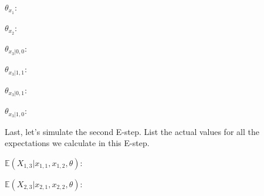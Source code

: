 \documentclass[11pt,addpoints,answers]{exam}
\begin{document}
\begin{questions}
\begin{questions}
$\theta_{x_1}$: \\
\begin{your_solution}[title=Your Answer:,height=3cm,width=10cm]
\end{your_solution}


$\theta_{x_2}$: \\
\begin{your_solution}[title=Your Answer:,height=3cm,width=10cm]
\end{your_solution}

$\theta_{x_3 | 0,0}$: \\
\begin{your_solution}[title=Your Answer:,height=3cm,width=10cm]
\end{your_solution}


$\theta_{x_3 | 1,1}$: \\
\begin{your_solution}[title=Your Answer:,height=3cm,width=10cm]
\end{your_solution}

$\theta_{x_3 | 0,1}$: \\
\begin{your_solution}[title=Your Answer:,height=3cm,width=10cm]
\end{your_solution}
\clearpage

$\theta_{x_3 | 1,0}$: \\
\begin{your_solution}[title=Your Answer:,height=3cm,width=10cm]
\end{your_solution}



\question[2] Last, let’s simulate the second E-step. List the actual values for all the expectations
we calculate in this E-step. 

$\mathbb{E}(X_{1,3}|x_{1,1},x_{1,2},\theta)$: \\
\begin{your_solution}[title=Your Answer:,height=3cm,width=10cm]
\end{your_solution}


$\mathbb{E}(X_{2,3}|x_{2,1},x_{2,2},\theta)$: \\
\begin{your_solution}[title=Your Answer:,height=3cm,width=10cm]
\end{your_solution}



\end{questions}

\clearpage


\end{questions}
\end{document}
